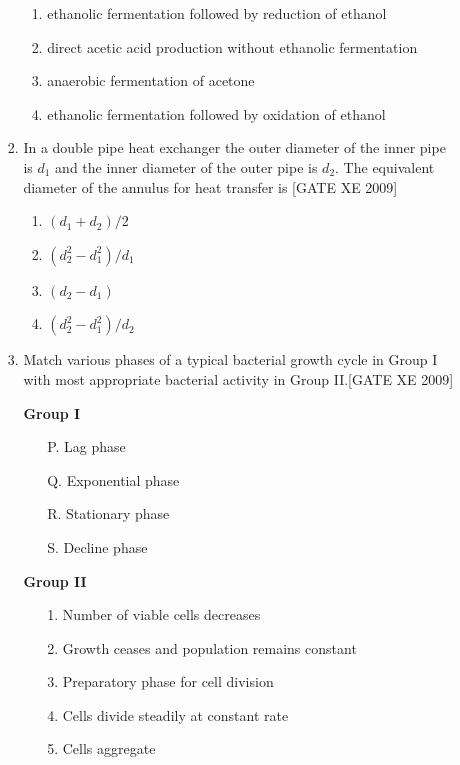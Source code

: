 \documentclass[journal,12pt,onecolumn]{IEEEtran}
\theoremstyle{remark}
\begin{document}
\begin{enumerate}
\begin{enumerate}
\begin{enumerate}[label=\textbf{Q.\arabic*.}, wide=0pt, leftmargin=*]
\begin{multicols}{2}
\begin{enumerate}
\item ethanolic fermentation followed by reduction of ethanol
\item direct acetic acid production without ethanolic fermentation
\item anaerobic fermentation of acetone
\item ethanolic fermentation followed by oxidation of ethanol
\end{enumerate}
\end{multicols}

\item In a double pipe heat exchanger the outer diameter of the inner pipe is $d_1$ and the inner diameter of the outer pipe is $d_2$. The equivalent diameter of the annulus for heat transfer is
\hfill[GATE XE 2009]
\begin{multicols}{2}
\begin{enumerate}
\item $(d_1 + d_2)/2$
\item $(d_2^2 - d_1^2)/d_1$
\item $(d_2 - d_1)$
\item $(d_2^2 - d_1^2)/d_2$
\end{enumerate}
\end{multicols}

\item Match various phases of a typical bacterial growth cycle in Group I with most appropriate bacterial activity in Group II.\hfill[GATE XE 2009]

\begin{minipage}[t]{0.45\textwidth}
\textbf{Group I}
\begin{itemize}
  \item[P.] Lag phase
  \item[Q.] Exponential phase
  \item[R.] Stationary phase
  \item[S.] Decline phase
\end{itemize}
\end{minipage}
\hfill
\begin{minipage}[t]{0.45\textwidth}
\textbf{Group II}
\begin{itemize}
  \item[1.] Number of viable cells decreases
  \item[2.] Growth ceases and population remains constant
  \item[3.] Preparatory phase for cell division
  \item[4.] Cells divide steadily at constant rate
  \item[5.] Cells aggregate
\end{itemize}
\end{minipage}


\end{enumerate}
\end{enumerate}
\end{enumerate}
\end{document}
